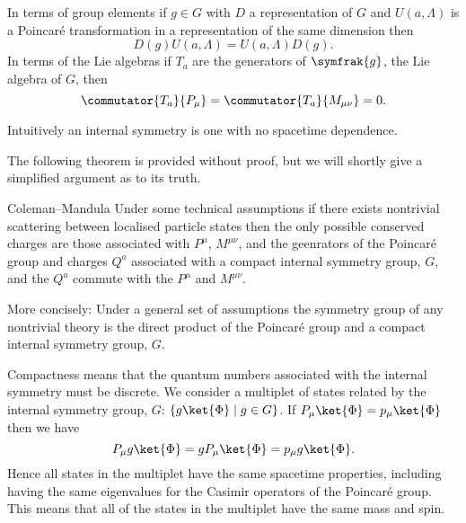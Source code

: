 \documentclass[fleqn]{NotesClass}
\renewcommand{\lie}[1]{\symfrak{#1}}
\begin{document}
    In terms of group elements if \(g \in G\) with \(D\) a representation of \(G\) and \(U(a, \Lambda)\) is a Poincar\'e transformation in a representation of the same dimension then
    \begin{equation}
        D(g)U(a, \Lambda) = U(a, \Lambda)D(g).
    \end{equation}
    In terms of the Lie algebras if \(T_a\) are the generators of \(\lie{g}\), the Lie algebra of \(G\), then
    \begin{equation}
        \commutator{T_a}{P_\mu} = \commutator{T_a}{M_{\mu\nu}} = 0.
    \end{equation}
    
    Intuitively an internal symmetry is one with no spacetime dependence.
    
    The following theorem is provided without proof, but we will shortly give a simplified argument as to its truth.
    
    \begin{thm}{Coleman--Mandula}{}
        Under some technical assumptions if there exists nontrivial scattering between localised particle states then the only possible conserved charges are those associated with \(P^\mu\), \(M^{\mu\nu}\), and the geenrators of the Poincar\'e group and charges \(Q^a\) associated with a compact internal symmetry group, \(G\), and the \(Q^a\) commute with the \(P^\mu\) and \(M^{\mu\nu}\).
        
        More concisely:
        Under a general set of assumptions the symmetry group of any nontrivial theory is the direct product of the Poincar\'e group and a compact internal symmetry group, \(G\).
    \end{thm}
    
    Compactness means that the quantum numbers associated with the internal symmetry must be discrete.
    We consider a multiplet of states related by the internal symmetry group, \(G\): \(\{g\ket{\Phi} \mid g \in G\}\).
    If \(P_\mu \ket{\Phi} = p_\mu\ket{\Phi}\) then we have
    \begin{equation}
        P_\mu g \ket{\Phi} = gP_\mu \ket{\Phi} = p_\mu g\ket{\Phi}.
    \end{equation}
    Hence all states in the multiplet have the same spacetime properties, including having the same eigenvalues for the Casimir operators of the Poincar\'e group.
    This means that all of the states in the multiplet have the same mass and spin.
    
\end{document}
